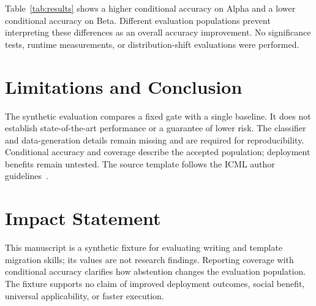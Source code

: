 Table~\ref{tab:results} shows a higher conditional accuracy on Alpha and a lower
conditional accuracy on Beta. Different evaluation populations prevent interpreting
these differences as an overall accuracy improvement. No significance tests,
runtime measurements, or distribution-shift evaluations were performed.
\section{Limitations and Conclusion}
The synthetic evaluation compares a fixed gate with a single baseline. It does
not establish state-of-the-art performance or a guarantee of lower risk.
The classifier and data-generation details remain missing and are required for
reproducibility. Conditional accuracy and coverage describe the accepted
population; deployment benefits remain untested.
The source template follows the ICML author guidelines~\cite{formatguide}.
\section*{Impact Statement}
This manuscript is a synthetic fixture for evaluating writing and template
migration skills; its values are not research findings. Reporting coverage with
conditional accuracy clarifies how abstention changes the evaluation population.
The fixture supports no claim of improved deployment outcomes, social benefit,
universal applicability, or faster execution.
\label{pw:main-end}
